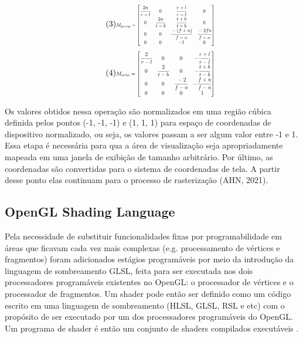 	\begin{equation} \label{eq-persp} \tag{3}
		\resizebox{.35\hsize}{!}{$ M_{persp}
		=
		\begin{bmatrix} 
			\cfrac{2n}{r-l} & 0 & \cfrac{r+l}{r-l} & 0 \\
			0 & \cfrac{2n}{t-b} & \cfrac{t+b}{t-b} & 0 \\
			0 & 0 & \cfrac{-(f+n)}{f-n} & \cfrac{-2fn}{f-n}\\
			0 & 0 & -1 & 0 \\
		\end{bmatrix} $}
	\end{equation}
	\begin{equation} \label{eq-ortho} \tag{4}
		\resizebox{.35\hsize}{!}{$ M_{orto}
		=
		\begin{bmatrix}
			\cfrac{2}{r-l} & 0 & 0 & -\cfrac{r+l}{r-l} \\
			0 & \cfrac{2}{t-b} & 0 & -\cfrac{t+b}{t-b} \\
			0 & 0 & \cfrac{-2}{f-n} & -\cfrac{f+n}{f-n}\\
			0 & 0 & 0 & 1 \\
		\end{bmatrix} $}
	\end{equation}

Os valores obtidos nessa operação são normalizados em uma região cúbica definida pelos pontos (-1, -1, -1) e (1, 1, 1) para espaço de coordenadas de dispositivo normalizado, ou seja, os valores passam a ser algum valor entre -1 e 1. Essa etapa é necessária para qua a área de visualização seja apropriadamente mapeada em uma janela de exibição de tamanho arbitrário. Por último, as coordenadas são convertidas para o sistema de coordenadas de tela. A partir desse ponto elas continuam para o processo de rasterização (AHN, 2021)\nocite{openglOnline}. 

\subsection{OpenGL Shading Language}
\label{sec:glsl}

Pela necessidade de substituir funcionalidades fixas por programabilidade em áreas que ficavam cada vez mais complexas (e.g. processamento de vértices e fragmentos) foram adicionados estágios programáveis por meio da introdução da linguagem de sombreamento \acrshort{GLSL}, feita para ser executada nos dois processadores programáveis existentes no OpenGL: o processador de vértices e o processador de fragmentos. Um shader pode então ser definido como um código escrito em uma linguagem de sombreamento (HLSL, GLSL, RSL e etc) com o propósito de ser executado por um dos processadores programáveis do OpenGL. Um programa de shader é então um conjunto de shaders compilados executáveis \cite{GLSLBook}. 

